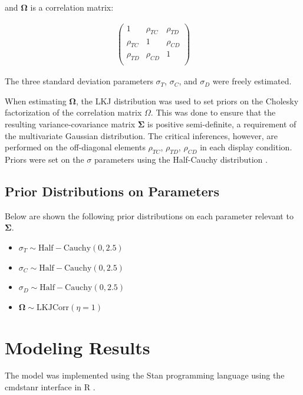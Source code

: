 and $\boldsymbol{\Omega}$ is a correlation matrix:

\begin{align}
   \begin{pmatrix}
      1 & \rho_{TC} & \rho_{TD} \\
      \rho_{TC} & 1 & \rho_{CD} \\
      \rho_{TD} & \rho_{CD} & 1 \\
   \end{pmatrix}
   \label{eqn:O_1}
\end{align}

The three standard deviation parameters $\sigma_{T}$, $\sigma_{C}$, and $\sigma_{D}$ were freely estimated.

When estimating $\boldsymbol{\Omega}$, the LKJ distribution \parencite{lewandowski2009generating} was used to set priors on the Cholesky factorization of the correlation matrix $\Omega$. This was done to ensure that the resulting variance-covariance matrix $\boldsymbol{\Sigma}$ is positive semi-definite, a requirement of the multivariate Gaussian distribution. The critical inferences, however, are performed on the off-diagonal elements $\rho_{TC}$, $\rho_{TD}$, $\rho_{CD}$ in each display condition. Priors were set on the $\sigma$ parameters using the Half-Cauchy distribution \parencite{gelman2006prior}. 

\subsection{Prior Distributions on Parameters}
Below are shown the following prior distributions on each parameter relevant to $\boldsymbol{\Sigma}$.
\begin{itemize}
    \item $\sigma_{T} \sim\mathrm{Half-Cauchy}(0,2.5)$
    \item $\sigma_{C} \sim\mathrm{Half-Cauchy}(0,2.5)$
    \item $\sigma_{D} \sim\mathrm{Half-Cauchy}(0,2.5)$
    \item $\boldsymbol{\Omega} \sim \mathrm{LKJCorr}(\eta=1)$
\end{itemize}

\section{Modeling Results}
The model was implemented using the Stan programming language \parencite{carpenter2017stan} using the cmdstanr interface \parencite{cmdstanr} in R . 

